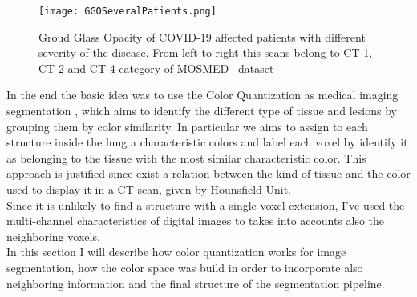 	\begin{figure}[h!]
		\centering
			\texttt{[image: GGOSeveralPatients.png]}
		\caption{Groud Glass Opacity of COVID-19 affected patients with different severity of the disease. From left to right this scans belong to CT-1, CT-2 and CT-4 category of MOSMED~\cite{DATA:MOSMED} dataset}
	\label{fig:GGO-Spatial}
	\end{figure}
	
	In the end the basic idea was to use the Color Quantization as medical imaging segmentation , which aims to identify the different type of tissue and lesions by grouping them by color similarity. In particular we aims to assign to each structure inside the lung a characteristic colors and label each voxel by identify it as belonging to the tissue with the most similar characteristic color. This approach is justified since exist a relation between the kind of tissue and the color used to display it in a CT scan, given by Hounsfield Unit.\\
	Since it is unlikely to find a structure with a single voxel extension, I've used the multi-channel characteristics of digital images to takes into accounts also the neighboring voxels.\\
	
	In this section I will describe how color quantization works for image segmentation, how the color space was build in order to incorporate also neighboring information and the final structure of the segmentation pipeline.

